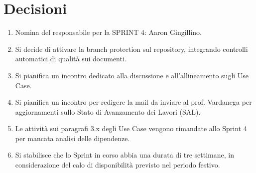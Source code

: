 \documentclass[a4paper,12pt]{article}
\begin{document}
\section{Decisioni}
\begin{enumerate}[noitemsep]
    \item Nomina del responsabile per la SPRINT 4: Aaron Gingillino.
    \item Si decide di attivare la branch protection sul repository, integrando controlli automatici di qualità sui documenti.
    \item Si pianifica un incontro dedicato alla discussione e all'allineamento sugli Use Case.
    \item Si pianifica un incontro per redigere la mail da inviare al prof. Vardanega per aggiornamenti sullo Stato di Avanzamento dei Lavori (SAL).
    \item Le attività sui paragrafi 3.x degli Use Case vengono rimandate allo Sprint 4 per mancata analisi delle dipendenze.
    \item Si stabilisce che lo Sprint in corso abbia una durata di tre settimane, in considerazione del calo di disponibilità previsto nel periodo festivo.
\end{enumerate}
\end{document}
